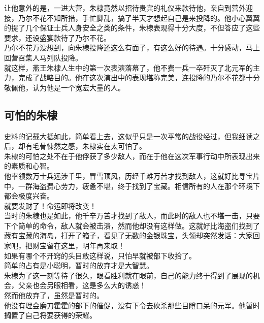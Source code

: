 \begin{multicols}{\theparacolNo}
让他意外的是，一进大营，朱棣竟然以招待贵宾的礼仪来款待他，亲自到营外迎接，乃尔不花不知所措，手忙脚乱，搞了半天才想起自己是来投降的。他小心翼翼的提了几个保证士兵人身安全之类的条件，朱棣表现得十分大度，不但答应了这些要求，还设盛宴款待了乃尔不花。\\

乃尔不花万没想到，向朱棣投降还这么有面子，有这么好的待遇。十分感动，马上回营召集人马列队投降。\\

就这样，燕王朱棣人生中的第一次表演落幕了，他不费一兵一卒歼灭了北元军的主力，完成了战略目的。他在这次演出中的表现堪称完美，连投降的乃尔不花都十分敬佩他，认为他是一个宽宏大量的人。\\

\subsection{可怕的朱棣}
史料的记载大抵如此，简单看上去，这似乎只是一次平常的战役经过，但我细读之后，却有毛骨悚然之感，朱棣实在太可怕了。\\

朱棣的可怕之处不在于他俘获了多少敌人，而在于他在这次军事行动中所表现出来的素质和心智。\\

他率领数万士兵远涉千里，冒雪顶风，历经千难万苦才找到敌人，这就好比寻宝片中，一群海盗费心劳力，疲惫不堪，终于找到了宝藏。相信所有的人在那个环境下都会极度兴奋。\\

就要发财了！命运即将改变！\\

当时的朱棣也是如此，他千辛万苦才找到了敌人，而此时的敌人也不堪一击，只要下个简单的命令，敌人就会被击溃，然而他却没有这样做。这就好比海盗们找到了藏有宝藏的海岛，打开了箱子，看见了无数的金银珠宝，头领却突然发话：大家回家吧，把财宝留在这里，明年再来取！\\

如果有哪个不开窍的头目敢这样说，只怕早就被部下收拾了。\\

简单的占有是小聪明，暂时的放弃才是大智慧。\\

朱棣为了这一刻等待了很久，眼看胜利就在眼前，自己的能力终于得到了展现的机会，父亲也会另眼相看，这是多么大的诱惑！\\

然而他放弃了，虽然是暂时的。\\

他没有理会磨刀霍霍的部下的催促，没有下令去砍杀那些目瞪口呆的元军。他暂时搁置了自己将要获得的荣耀。\\


\end{multicols}
